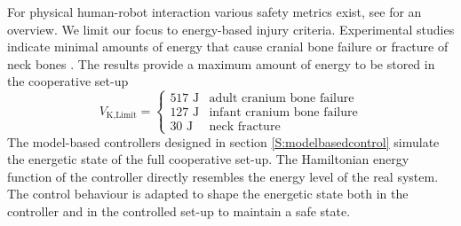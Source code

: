 \documentclass[a4paper,twoside, openright,12pt]{report}
\newcommand{\g}[1]{\text{#1}}
\begin{document}
For physical human-robot interaction various safety metrics exist, see \cite{Haddadin_14} for an overview. We limit our focus to energy-based injury criteria. Experimental studies indicate minimal amounts of energy  that cause cranial bone failure \cite{Wood_71} or fracture of neck bones \cite{Yoganandan_96}. The results provide a maximum amount of energy to be stored in the cooperative set-up
\begin{equation}
V_{\g{K,Limit}} = 
\begin{cases}
517 \text{ J} & \text{adult cranium bone failure} \\
127 \text{ J} & \text{infant cranium bone failure} \\
30 \text{ J} & \text{neck fracture}
\end{cases}
\end{equation}
The model-based controllers designed in section \ref{S:modelbasedcontrol} simulate the energetic state of the full cooperative set-up. The Hamiltonian energy function of the controller directly resembles the energy level of the real system. The control behaviour is adapted to shape the energetic state both in the controller and in the controlled set-up to maintain a safe state. 
       
   
\end{document}
